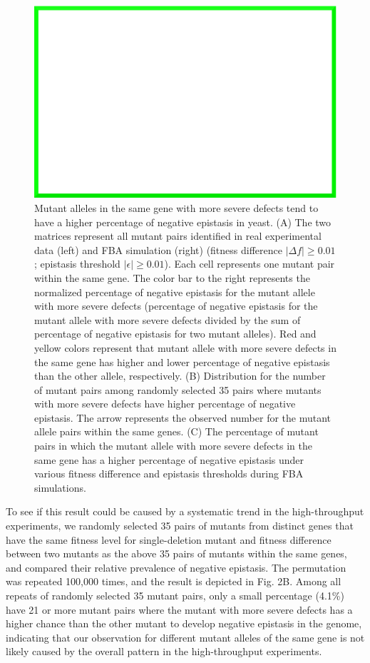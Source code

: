 \begin{figure}
\centering
\includegraphics[width=\textwidth]{dummy}
\caption{Mutant alleles in the same gene with more severe defects tend
to have a higher percentage of negative epistasis in yeast. (A) The
two matrices represent all mutant pairs identified in real
experimental data (left) and FBA simulation (right) (fitness
difference $\left|\Delta f\right| \geq 0.01$; epistasis threshold
$\left|\epsilon\right| \geq 0.01$). Each cell
represents one mutant pair within the same gene. The color bar to the
right represents the normalized percentage of negative epistasis for
the mutant allele with more severe defects (percentage of negative
epistasis for the mutant allele with more severe defects divided by the sum of
percentage of negative epistasis for two mutant alleles). Red and
yellow colors represent that mutant allele with more severe defects in
the same gene has higher and lower percentage of negative epistasis
than the other allele, respectively. (B) Distribution for the number
of mutant pairs among randomly selected 35 pairs where mutants with
more severe defects have higher percentage of negative epistasis. The
arrow represents the observed number for the mutant allele pairs
within the same genes. (C) The percentage of mutant pairs in which the
mutant allele with more severe defects in the same gene has a higher
percentage of negative epistasis under various fitness difference and
epistasis thresholds during FBA simulations.}
\label{fig:expVerifyYeast1}
\end{figure}

To see if this result could be caused by a systematic trend in the
high-throughput experiments, we randomly selected 35 pairs of mutants
from distinct genes that have the same fitness level for
single-deletion mutant and fitness difference between two mutants as
the above 35 pairs of mutants within the same genes, and compared
their relative prevalence of negative epistasis. The permutation was
repeated 100,000 times, and the result is depicted in Fig. 2B. Among
all repeats of randomly selected 35 mutant pairs, only a small
percentage (4.1\%) have 21 or more mutant pairs where the mutant with
more severe defects has a higher chance than the other mutant to
develop negative epistasis in the genome, indicating that our
observation for different mutant alleles of the same gene is not
likely caused by the overall pattern in the high-throughput
experiments.

